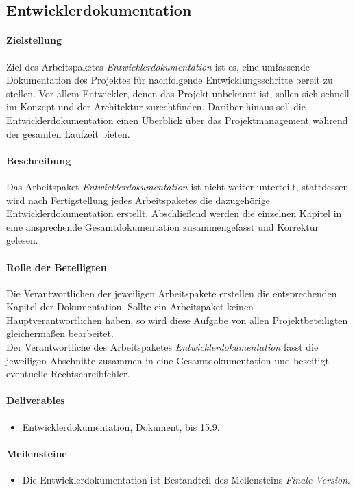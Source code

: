 \subsection{Entwicklerdokumentation}

\paragraph{Zielstellung}\noindent
Ziel des Arbeitspaketes \textit{Entwicklerdokumentation} ist es, eine umfassende Dokumentation des Projektes für nachfolgende Entwicklungsschritte bereit zu stellen. Vor allem Entwickler, denen das Projekt unbekannt ist, sollen sich schnell im Konzept und der Architektur zurechtfinden. Darüber hinaus soll die Entwicklerdokumentation einen Überblick über das Projektmanagement während der gesamten Laufzeit bieten.

\paragraph{Beschreibung}\noindent
Das Arbeitspaket \textit{Entwicklerdokumentation} ist nicht weiter unterteilt, stattdessen wird nach Fertigstellung jedes Arbeitspaketes die dazugehörige Entwicklerdokumentation erstellt. Abschließend werden die einzelnen Kapitel in eine ansprechende Gesamtdokumentation zusammengefasst und Korrektur gelesen.

\paragraph{Rolle der Beteiligten}\noindent
Die Verantwortlichen der jeweiligen Arbeitspakete erstellen die entsprechenden Kapitel der Dokumentation. Sollte ein Arbeitspaket keinen Hauptverantwortlichen haben, so wird diese Aufgabe von allen Projektbeteiligten gleichermaßen bearbeitet.\\
Der Verantwortliche des Arbeitspaketes \textit{Entwicklerdokumentation} fasst die jeweiligen Abschnitte zusammen in eine Gesamtdokumentation und beseitigt eventuelle Rechtschreibfehler.

\paragraph{Deliverables}\noindent
\begin{itemize}
\item Entwicklerdokumentation, Dokument, bis 15.9.
\end{itemize}

\paragraph{Meilensteine}\noindent
\begin{itemize}
\item Die Entwicklerdokumentation ist Bestandteil des Meilensteins \textit{Finale Version}.
\end{itemize}